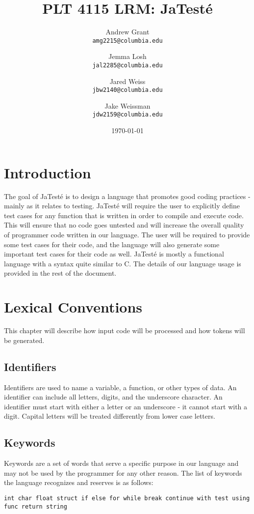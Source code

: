 \documentclass{article}
\title{PLT 4115 LRM: \textbf{JaTest\'{e}}}
\author{
	Andrew Grant\\
	\texttt{amg2215@columbia.edu}
	\and
	Jemma Losh\\
	\texttt{jal2285@columbia.edu}
	\and
	Jared Weiss\\
	\texttt{jbw2140@columbia.edu}
	\and
	Jake Weissman\\
	\texttt{jdw2159@columbia.edu}
}
\date{\today}
\begin{document}
\maketitle

\section{Introduction}
The goal of JaTest\'{e} is to design a language that promotes good coding practices - mainly as it relates to testing.  JaTest\'{e} will require the user to explicitly define test cases for any function that is written in order to compile and execute code.  This will ensure that no code goes untested and will increase the overall quality of programmer code written in our language.  The user will be required to provide some test cases for their code, and the language will also generate some important test cases for their code as well.  JaTest\'{e} is mostly a functional language with a syntax quite similar to C.  The details of our language usage is provided in the rest of the document.

\section{Lexical Conventions}
This chapter will describe how input code will be processed and how tokens will be generated.

\subsection{Identifiers}
Identifiers are used to name a variable, a function, or other types of data.  An identifier can include all letters, digits, and the underscore character.  An identifier must start with either a letter or an underscore - it cannot start with a digit.  Capital letters will be treated differently from lower case letters.

\subsection{Keywords}
Keywords are a set of words that serve a specific purpose in our language and may not be used by the programmer for any other reason.  The list of keywords the language recognizes and reserves is as follows: 

\texttt{int char float struct if else for while break continue with test using func return string}
\end{document}
